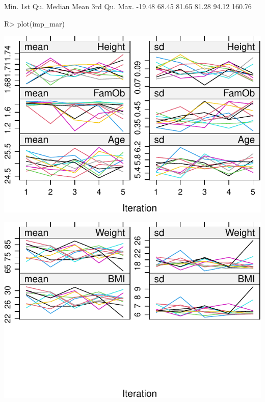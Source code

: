 \documentclass[
]{jss}
\begin{document}
\begin{CodeChunk}
\begin{CodeOutput}
   Min. 1st Qu.  Median    Mean 3rd Qu.    Max. 
 -19.48   68.45   81.65   81.28   94.12  160.76 
\end{CodeOutput}
\begin{CodeInput}
R> plot(imp_mar)
\end{CodeInput}


\begin{center}\includegraphics{Imputation_of_Incomplete_Multilevel_Data_files/figure-latex/obsmar_plot-1} \end{center}



\begin{center}\includegraphics{Imputation_of_Incomplete_Multilevel_Data_files/figure-latex/obsmar_plot-2} \end{center}

\end{CodeChunk}
\end{document}
